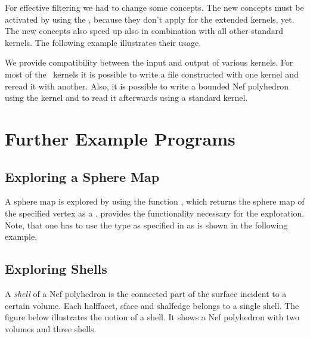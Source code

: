 For effective filtering we had to change some concepts. The new
concepts must be activated by using the ,
because they don't apply for the extended kernels, yet. The new
concepts also speed up  also in combination with
all other standard kernels. The following example illustrates their usage.


We provide compatibility between the input and output of various
kernels. For most of the \cgal\ kernels it is possible to write a file
constructed with one kernel and reread it with another. Also, it is
possible to write a bounded Nef polyhedron using the
 kernel and to read it afterwards using a
standard kernel.


\section{Further Example Programs}

\subsection{Exploring a Sphere Map}

A sphere map is explored by using the function , which 
returns the sphere map of the specified vertex as a .
 provides the functionality necessary for the
exploration.
Note, that one has to use
the type  as specified in  as 
is shown in the following example.


\subsection{Exploring Shells}

A \emph{shell} of a Nef polyhedron is the connected part of the
surface incident to a certain volume.  Each halffacet, sface and
shalfedge belongs to a single shell. The figure below illustrates the
notion of a shell.  It shows a Nef polyhedron with two volumes and
three shells.

